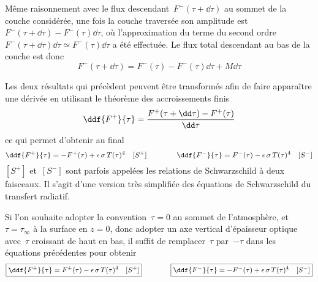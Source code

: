 \sk
Même raisonnement avec le flux descendant~$F^-(\tau+\dd\tau)$ au sommet de la couche considérée,
une fois la couche traversée son amplitude est~$F^-(\tau+\dd\tau) - F^-(\tau) \dd\tau$, où 
l'approximation du terme du second ordre~$F^-(\tau+\dd\tau) \dd\tau \simeq F^-(\tau) \dd\tau$
a été effectuée.
Le flux total descendant au bas de la couche est donc
\[
F^-(\tau+\dd\tau) = F^-(\tau) - F^-(\tau) \dd\tau + M\dd\tau
\]

\sk
Les deux résultats qui précèdent peuvent être transformés 
afin de faire apparaître une dérivée
en utilisant le théorème des accroissements finis
\[
\ddf{F^+}{\tau} = \frac{F^+(\tau+\dd\tau) - F^+(\tau)}{\dd\tau}
\]
\noindent ce qui permet d'obtenir au final
\[
\ddf{F^+}{\tau} = - F^+(\tau) + \epsilon\,\sigma\,T(\tau)^4 \quad [S^+]
\qquad\qquad 
\ddf{F^-}{\tau} = F^-(\tau) - \epsilon\,\sigma\,T(\tau)^4 \quad [S^-]
\]
\noindent $[S^+]$ et~$[S^-]$ sont parfois appelées les relations de Schwarzschild à deux faisceaux.
Il s'agit d'une version très simplifiée des équations de Schwarzschild du transfert radiatif.

\sk
Si l'on souhaite adopter la convention~$\tau=0$ au sommet de l'atmosphère,
et $\tau=\tau_{\infty}$ à la surface en $z=0$, donc adopter un axe
vertical d'épaisseur optique avec~$\tau$ croissant de haut en bas, il
suffit de remplacer~$\tau$ par~$-\tau$ dans les équations précédentes pour obtenir
\[
\boxed{\ddf{F^+}{\tau} = F^+(\tau) - \epsilon\,\sigma\,T(\tau)^4 \quad [S^+]} 
\qquad\qquad 
\boxed{\ddf{F^-}{\tau} = -F^-(\tau) + \epsilon\,\sigma\,T(\tau)^4 \quad [S^-]}
\]







